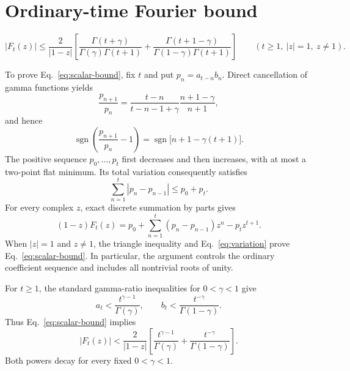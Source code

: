 \documentclass[aps,pra,reprint,superscriptaddress,longbibliography,nofootinbib]{revtex4-2}
\begin{document}
\section{Ordinary-time Fourier bound}
\label{sec:scalar-bound}

\begin{widetext}
\begin{equation}
 \boxed{
 |F_t(z)|\leq\frac{2}{|1-z|}\left[
 \frac{\Gamma(t+\gamma)}{\Gamma(\gamma)\Gamma(t+1)}
 +\frac{\Gamma(t+1-\gamma)}{\Gamma(1-\gamma)\Gamma(t+1)}
 \right] }
 \qquad (t\geq1,\ |z|=1,\ z\ne1).
 \label{eq:scalar-bound}
\end{equation}
\end{widetext}

To prove Eq.~\eqref{eq:scalar-bound}, fix $t$ and put
$p_n=a_{t-n}b_n$.  Direct cancellation of gamma functions yields
\begin{equation}
 \frac{p_{n+1}}{p_n}
 =\frac{t-n}{t-n-1+\gamma}\frac{n+1-\gamma}{n+1},
 \label{eq:ratio}
\end{equation}
and hence
\begin{equation}
 \operatorname{sgn}\!\left(\frac{p_{n+1}}{p_n}-1\right)
 =\operatorname{sgn}\bigl[n+1-\gamma(t+1)\bigr].
 \label{eq:ratio-sign}
\end{equation}
The positive sequence $p_0,\ldots,p_t$ first decreases and then increases,
with at most a two-point flat minimum.  Its total variation consequently
satisfies
\begin{equation}
 \sum_{n=1}^{t}|p_n-p_{n-1}|\leq p_0+p_t.
 \label{eq:variation}
\end{equation}
For every complex $z$, exact discrete summation by parts gives
\begin{equation}
 (1-z)F_t(z)=p_0+\sum_{n=1}^{t}(p_n-p_{n-1})z^n-p_tz^{t+1}.
 \label{eq:summation-by-parts}
\end{equation}
When $|z|=1$ and $z\ne1$, the triangle inequality and
Eq.~\eqref{eq:variation} prove Eq.~\eqref{eq:scalar-bound}.  In particular,
the argument controls the ordinary coefficient sequence and includes all
nontrivial roots of unity.

For $t\geq1$, the standard gamma-ratio inequalities for $0<\gamma<1$ give
\begin{equation}
 a_t<\frac{t^{\gamma-1}}{\Gamma(\gamma)},\qquad
 b_t<\frac{t^{-\gamma}}{\Gamma(1-\gamma)}.
 \label{eq:gamma-ratio-bound}
\end{equation}
Thus Eq.~\eqref{eq:scalar-bound} implies
\begin{equation}
 |F_t(z)|<\frac{2}{|1-z|}\left[
 \frac{t^{\gamma-1}}{\Gamma(\gamma)}
 +\frac{t^{-\gamma}}{\Gamma(1-\gamma)}\right].
 \label{eq:scalar-power-bound}
\end{equation}
Both powers decay for every fixed $0<\gamma<1$.
\end{document}
